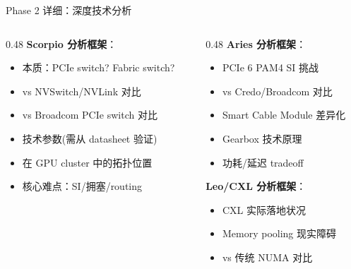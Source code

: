 \documentclass[UTF8,11pt,aspectratio=169]{beamer}
\begin{document}
\begin{frame}{Phase 2 详细：深度技术分析}
    \begin{columns}[T]
        \begin{column}{0.48\textwidth}
            \textbf{Scorpio 分析框架}：
            \begin{itemize}
                \item 本质：PCIe switch? Fabric switch?
                \item vs NVSwitch/NVLink 对比
                \item vs Broadcom PCIe switch 对比
                \item 技术参数(需从 datasheet 验证)
                \item 在 GPU cluster 中的拓扑位置
                \item 核心难点：SI/拥塞/routing
            \end{itemize}
        \end{column}
        \begin{column}{0.48\textwidth}
            \textbf{Aries 分析框架}：
            \begin{itemize}
                \item PCIe 6 PAM4 SI 挑战
                \item vs Credo/Broadcom 对比
                \item Smart Cable Module 差异化
                \item Gearbox 技术原理
                \item 功耗/延迟 tradeoff
            \end{itemize}
            \vspace{0.3cm}
            \textbf{Leo/CXL 分析框架}：
            \begin{itemize}
                \item CXL 实际落地状况
                \item Memory pooling 现实障碍
                \item vs 传统 NUMA 对比
            \end{itemize}
        \end{column}
    \end{columns}
\end{frame}
\end{document}
